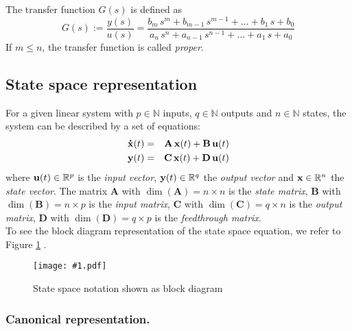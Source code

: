 \documentclass[a4paper,12pt]{article}
\newcommand{\Fig}[3]{%
	\begin{figure}[htb]%
	\begin{center}%
	\texttt{[image: \#1.pdf]}%
	\end{center}%
	\caption{#3\label{fig:#1}}%
	\end{figure}%
	}
\newcommand{\FigRef}[1]{%
	Figure \ref{fig:#1}%
	}
\renewcommand{\Vec}[1]{{\bf #1}}
\newcommand{\Mat}[1]{\mathbf{#1}}
\newcommand{\SubSection}[2]{\subsection{#2}\label{subsection:#1}}
\newcommand{\SubSubSection}[2]{\subsubsection{#2}\label{subsubsection:#1}}
\begin{document}
The transfer function $G(s)$ is defined as
\begin{equation}
G(s):=\frac{y(s)}{u(s)}=\frac{b_{m}\,s^{m}+b_{m-1}\,s^{m-1}+\ldots+b_{1}\,s+b_{0}}{a_{n}\,s^{n}+a_{n-1}\,s^{n-1}+\ldots+a_{1}\,s+a_{0}}
\end{equation}
If $m\leq n$, the transfer function is called {\em proper}.

\SubSection{sspace}{State space representation}

For a given linear system with $p\in\mathbb{N}$ inputs, $q\in\mathbb{N}$
outputs and $n\in\mathbb{N}$ states, the system can be described by a set
of equations:
\begin{eqnarray}
\Vec{\dot{x}}(t)&=&\Mat{A}\,\Vec{x}(t)+\Mat{B}\,\Vec{u}(t)\\
\Vec{y}(t)&=&\Mat{C}\,\Vec{x}(t)+\Mat{D}\,\Vec{u}(t)
\end{eqnarray}
where $\Vec{u}(t)\in\mathbb{R}^p$ is the {\em input vector},
$\Vec{y}(t)\in\mathbb{R}^q$ the {\em output vector} and $\Vec{x}\in\mathbb{R}^n$
the {\em state vector}. The matrix $\Mat{A}$ with $\dim(\Mat{A})=n\times n$ is
the {\em state matrix}, $\Mat{B}$ with $\dim(\Mat{B})=n\times p$ is the
{\em input matrix}, $\Mat{C}$ with $\dim(\Mat{C})=q\times n$ is the
{\em output matrix}, $\Mat{D}$ with $\dim(\Mat{D})=q\times p$ is the
{\em feedthrough matrix}.\\

To see the block diagram representation of the state space equation, we refer
to \FigRef{statespace}.\\

\Fig{statespace}{0.8}{State space notation shown as block diagram}

\SubSubSection{canonical}{Canonical representation.}
\end{document}
